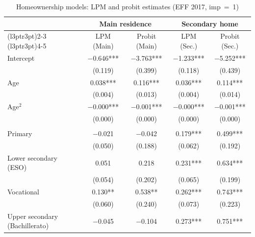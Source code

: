\begin{table}

\caption{Homeownership models: LPM and probit estimates (EFF 2017, imp~=~1)}
\centering
\begin{tabular}[t]{lcccc}
\toprule
\multicolumn{1}{c}{\textbf{ }} & \multicolumn{2}{c}{\textbf{Main residence}} & \multicolumn{2}{c}{\textbf{Secondary home}} \\
\cmidrule(l{3pt}r{3pt}){2-3} \cmidrule(l{3pt}r{3pt}){4-5}
  & LPM (Main) & Probit (Main) & LPM (Sec.) & Probit (Sec.)\\
\midrule
Intercept & \num{-0.646}*** & \num{-3.763}*** & \num{-1.233}*** & \num{-5.252}***\\
 & (\num{0.119}) & (\num{0.399}) & (\num{0.118}) & (\num{0.439})\\
Age & \num{0.038}*** & \num{0.116}*** & \num{0.036}*** & \num{0.114}***\\
 & (\num{0.004}) & (\num{0.013}) & (\num{0.004}) & (\num{0.014})\\
Age$^2$ & \num{-0.000}*** & \num{-0.001}*** & \num{-0.000}*** & \num{-0.001}***\\
 & (\num{0.000}) & (\num{0.000}) & (\num{0.000}) & (\num{0.000})\\
\addlinespace[0.3em]
\multicolumn{5}{l}{\textit{Education (ref.: Illiterate)}}\\
\hspace{1em}\hspace{6pt} Primary & \num{-0.021} & \num{-0.042} & \num{0.179}*** & \num{0.499}***\\
\hspace{1em} & (\num{0.050}) & (\num{0.188}) & (\num{0.062}) & (\num{0.192})\\
\hspace{1em}\hspace{6pt} Lower secondary (ESO) & \num{0.051} & \num{0.218} & \num{0.231}*** & \num{0.634}***\\
\hspace{1em} & (\num{0.054}) & (\num{0.202}) & (\num{0.065}) & (\num{0.199})\\
\hspace{1em}\hspace{6pt} Vocational & \num{0.130}** & \num{0.538}** & \num{0.262}*** & \num{0.743}***\\
\hspace{1em} & (\num{0.060}) & (\num{0.240}) & (\num{0.073}) & (\num{0.223})\\
\hspace{1em}\hspace{6pt} Upper secondary (Bachillerato) & \num{-0.045} & \num{-0.104} & \num{0.273}*** & \num{0.751}***\\

\end{tabular}
\end{table}
